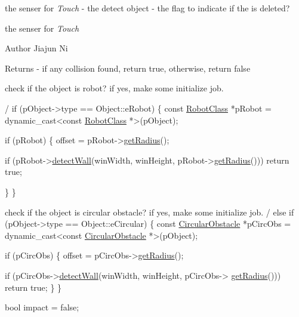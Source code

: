 the senser for {\itshape Touch}  -\/ the detect object  -\/ the flag to indicate if the  is deleted? 

the senser for {\itshape Touch}

\begin{DoxyAuthor}{Author}
Jiajun Ni 
\end{DoxyAuthor}
\begin{DoxyReturn}{Returns}
-\/ if any collision found, return true, otherwise, return false 
\end{DoxyReturn}

\begin{DoxyCode}
   check \textcolor{keywordflow}{if} the \textcolor{keywordtype}{object} is robot? \textcolor{keywordflow}{if} yes, make some initialize job.
   
  / 
\textcolor{keywordflow}{if} (pObject->type == Object::eRobot)
\{
    \textcolor{keyword}{const} \hyperlink{classRobotClass}{RobotClass} *pRobot = \textcolor{keyword}{dynamic\_cast<}\textcolor{keyword}{const }\hyperlink{classRobotClass}{RobotClass} *\textcolor{keyword}{>}(pObject);
    
    \textcolor{keywordflow}{if} (pRobot)
    \{
        offset = pRobot->\hyperlink{classRobotClass_a61a9c5217fb1092668c55864b7e4bad0}{getRadius}();
        
        \textcolor{keywordflow}{if} (pRobot->\hyperlink{classObject_ad9adac7de77247bd045a43c317794899}{detectWall}(winWidth, winHeight, pRobot->\hyperlink{classRobotClass_a61a9c5217fb1092668c55864b7e4bad0}{getRadius}()))
            \textcolor{keywordflow}{return} \textcolor{keyword}{true};
            
    \}
\}
\end{DoxyCode}



\begin{DoxyCode}
   check \textcolor{keywordflow}{if} the \textcolor{keywordtype}{object} is circular obstacle? \textcolor{keywordflow}{if} yes, make some initialize job.
  / 
\textcolor{keywordflow}{else} \textcolor{keywordflow}{if} (pObject->type == Object::eCircular)
\{
    \textcolor{keyword}{const} \hyperlink{classCircularObstacle}{CircularObstacle} *pCircObs = \textcolor{keyword}{dynamic\_cast<}\textcolor{keyword}{const }
      \hyperlink{classCircularObstacle}{CircularObstacle} *\textcolor{keyword}{>}(pObject);
    
    \textcolor{keywordflow}{if} (pCircObs)
    \{
        offset = pCircObs->\hyperlink{classCircularObstacle_a4389dbe384efd2055adfbf2bfd8c8683}{getRadius}();
        
        \textcolor{keywordflow}{if} (pCircObs->\hyperlink{classObject_ad9adac7de77247bd045a43c317794899}{detectWall}(winWidth, winHeight, pCircObs->
      \hyperlink{classCircularObstacle_a4389dbe384efd2055adfbf2bfd8c8683}{getRadius}()))
            \textcolor{keywordflow}{return} \textcolor{keyword}{true};
    \}
\}

\textcolor{keywordtype}{bool} impact = \textcolor{keyword}{false};
\end{DoxyCode}



